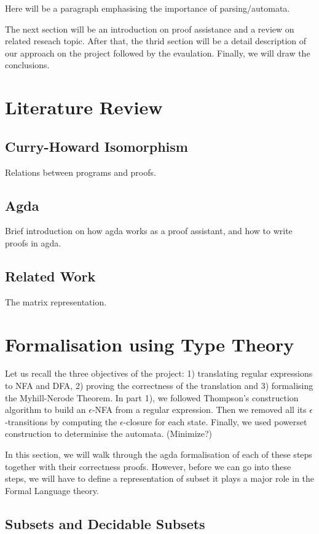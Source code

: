 \documentclass[twoside,openright,final]{bhamthesis}
\begin{document}
\par Here will be a paragraph emphasising the importance of
parsing/automata. 

\par The next section will be an introduction on proof assistance and
a review on related reseach topic. After that, the thrid section will
be a detail description of our approach on the project followed by the
evaulation. Finally, we will draw the conclusions. 


\section{Literature Review}
\subsection{Curry-Howard Isomorphism}
Relations between programs and proofs.
\subsection{Agda}
Brief introduction on how agda works as a proof assistant, and how to
write proofs in agda.
\subsection{Related Work}
The matrix representation.


\section{Formalisation using Type Theory}
Let us recall the three objectives of the project: 1) translating
regular expressions to NFA and DFA, 2) proving the correctness of the translation 
and 3) formalising the Myhill-Nerode Theorem. In part 1), we followed Thompson's
construction algorithm to build an \(\epsilon\)-NFA from a
regular expression. Then we removed all its \(\epsilon\)-transitions by computing the
\(\epsilon\)-closure for each state. Finally, we used powerset
construction to determinise the automata. (Minimize?) 

\par In this section, we will walk through the agda formalisation of
each of these steps together with their correctness proofs. However,
before we can go into these steps, we will have to define a
representation of subset it plays a major role in the Formal Language theory. 

\subsection{Subsets and Decidable Subsets}
\end{document}
